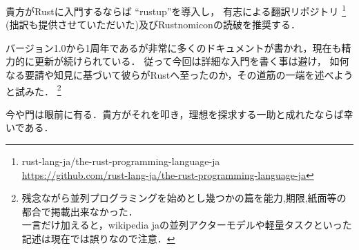 貴方がRustに入門するならば ``rustup''を導入し，
有志による翻訳リポジトリ
\footnote{rust-lang-ja/the-rust-programming-language-ja \\
  \url{https://github.com/rust-lang-ja/the-rust-programming-language-ja}}
(拙訳も提供させていただいた)及びRustnomiconの読破を推奨する．

バージョン1.0から1周年であるが非常に多くのドキュメントが書かれ，現在も精力的に更新が続けられている．
従って今回は詳細な入門を書く事は避け，
如何なる要請や知見に基づいて彼らがRustへ至ったのか，その道筋の一端を述べようと試みた．
\footnote{残念ながら並列プログラミングを始めとし幾つかの篇を能力,期限,紙面等の都合で掲載出来なかった．
  \\ 一言だけ加えると，wikipedia jaの並列アクターモデルや軽量タスクといった記述は現在では誤りなので注意．}

今や門は眼前に有る．貴方がそれを叩き，理想を探求する一助と成れたならば幸いである．
